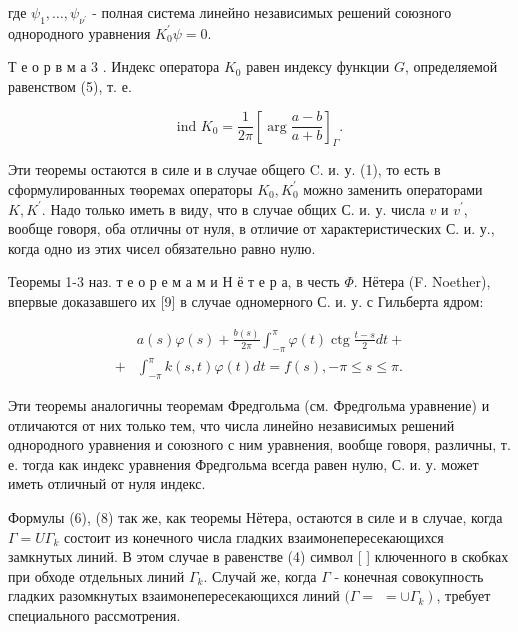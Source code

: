 \documentclass[10pt]{article}
\begin{document}
где $\psi_{1}, \ldots, \psi_{\nu^{\prime}}$ - полная система линейно независимых решений союзного однородного уравнения $K_{0}^{\prime} \psi=0$.



Т е о р в м а 3 . Индекс оператора $K_{0}$ равен индексу функции $G$, определяемой равенством (5), т. е.



\[

\text { ind } K_{0}=\frac{1}{2 \pi}\left[\arg \frac{a-b}{a+b}\right]_{\Gamma} \text {. }

\]



Эти теоремы остаются в силе и в случае общего C. и. у. (1), то есть в сформулированных төоремах операторы $K_{0}, K_{0}^{\prime}$ можно заменить операторами $K, K^{\prime}$. Надо только иметь в виду, что в случае общих С. и. у. числа $v$ и $v^{\prime}$, вообще говоря, оба отличны от нуля, в отличие от характеристических С. и. у., когда одно из этих чисел обязательно равно нулю.



Теоремы 1-3 наз. т е о р е м а м и Н ё т е р а, в честь $\Phi$. Нётера (F. Noether), впервые доказавшего их [9] в случае одномерного С. и. у. с Гильберта ядром:



\[

\begin{aligned}

& a(s) \varphi(s)+\frac{b(s)}{2 \pi} \int_{-\pi}^{\pi} \varphi(t) \operatorname{ctg} \frac{t-s}{2} d t+ \\

+ & \int_{-\pi}^{\pi} k(s, t) \varphi(t) d t=f(s),-\pi \leqslant s \leqslant \pi .

\end{aligned}

\]



Эти теоремы аналогичны теоремам Фредгольма (см. Фредгольма уравнение) и отличаются от них только тем, что числа линейно независимых решений однородного уравнения и союзного с ним уравнения, вообще говоря, различны, т. е. тогда как индекс уравнения Фредгольма всегда равен нулю, С. и. у. может иметь отличный от нуля индекс.



Формулы (6), (8) так же, как теоремы Нётера, остаются в силе и в случае, когда $\Gamma=U \Gamma_{k}$ состоит из конечного числа гладких взаимонепересекающихся замкнутых линий. В этом случае в равенстве (4) символ [ ] ключенного в скобках при обходе отдельных линий $\Gamma_{k}$. Случай же, когда $\Gamma$ - конечная совокупность гладких разомкнутых взаимонепересекающихся линий $(\Gamma=$ $\left.=\cup \Gamma_{k}\right)$, требует специального рассмотрения.
\end{document}
